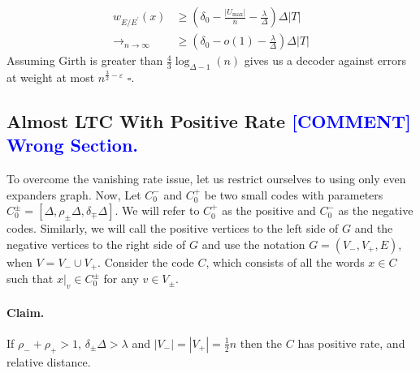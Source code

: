 \documentclass{article}
\newcommand{\commentt}[1]{\textcolor{blue}{ \textbf{[COMMENT]} #1}}
\newcommand{\ctt}[1]{\commentt{#1}}
\begin{document}
\begin{multicols*}{2}
  \begin{equation*}
    \begin{split}
      w_{E/E^{\prime}}\left( x \right) & \ge \left( \delta_{0} - \frac{|U_{\max}|}{n} - \frac{\lambda}{\Delta} \right) \Delta|T|  \\ 
      \rightarrow_{n \rightarrow \infty} &  \ge  \left( \delta_{0} - o(1)  - \frac{\lambda}{\Delta} \right) \Delta|T| 
    \end{split}
  \end{equation*}
  Assuming Girth is greater than $\frac{4}{3}\log_{\Delta-1}\left( n \right)$  gives us a decoder against errors at weight at most $n^{\frac{3}{2}-\varepsilon}$ $\square$. 


  \subsection{ Almost LTC With Positive Rate \ctt{ Wrong Section.  } } 
  To overcome the vanishing rate issue, let us restrict ourselves to using only even expanders graph. Now, Let $C_{0}^{-}$ and $C_{0}^{+}$ be two small codes with parameters $C_{0}^{\pm} = [\Delta, \rho_{\pm}\Delta, \delta_{\mp}\Delta]$. We will refer to $C_{0}^{+}$ as the positive and $C_{0}^{-}$ as the negative codes. Similarly, we will call the positive vertices to the left side of $G$ and the negative vertices to the right side of $G$ and use the notation $G = \left( V_{-}, V_{+}, E \right)$, when $V = V_{-} \cup V_{+}$. 
  Consider the code $C$, which consists of all the words $x\in C$ such that $x|_{v} \in C_{0}^{\pm}$ for any $v \in V_{\pm}$.
  \paragraph{Claim.} If $\rho_{-} + \rho_{+} > 1$, $\delta_{\pm}\Delta > \lambda$ and $|V_{-}| = |V_{+}| = \frac{1}{2}n$ then the $C$ has positive rate, and relative distance. 

\end{multicols*}
\end{document}
